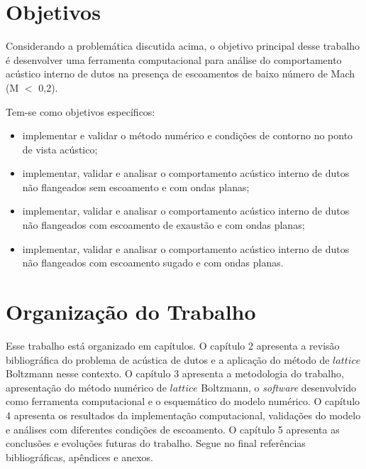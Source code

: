 \section{Objetivos}

Considerando a problemática discutida acima, o objetivo principal desse trabalho é desenvolver uma ferramenta computacional para análise do comportamento acústico interno de dutos na presença de escoamentos de baixo número de Mach (M $<$ 0,2).

Tem-se como objetivos específicos:
\begin{itemize}
    \item implementar e validar o método numérico e condições de contorno no ponto de vista acústico;
    \item implementar, validar e analisar o comportamento acústico interno de dutos não flangeados sem escoamento e com ondas planas;
    \item implementar, validar e analisar o comportamento acústico interno de dutos não flangeados com escoamento de exaustão e com ondas planas;
    \item implementar, validar e analisar o comportamento acústico interno de dutos não flangeados com escoamento sugado e com ondas planas.
\end{itemize}

\section{Organização do Trabalho}

Esse trabalho está organizado em capítulos. O capítulo 2 apresenta a revisão bibliográfica do problema de acústica de dutos e a aplicação do método de $lattice$ Boltzmann nesse contexto. O capítulo 3 apresenta a metodologia do trabalho, apresentação do método numérico de $lattice$ Boltzmann, o \textit{software} desenvolvido como ferramenta computacional e o esquemático do modelo numérico. O capítulo 4 apresenta os resultados da implementação computacional, validações do modelo e análises com diferentes condições de escoamento. O capítulo 5 apresenta as conclusões e evoluções futuras do trabalho. Segue no final referências bibliográficas, apêndices e anexos.